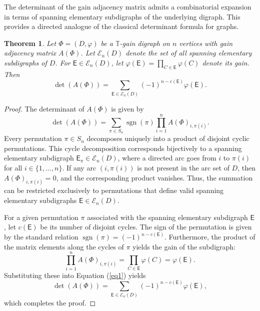 \documentclass[12pt]{article}
\newtheorem{theorem}{Theorem}[section]
\theoremstyle{definition}
\begin{document}
The determinant of the gain adjacency matrix admits a combinatorial expansion in terms of spanning elementary subdigraphs of the underlying digraph. This provides a directed analogue of the classical determinant formula for graphs.

\begin{theorem}
  \label{thm:sachs-det}
  Let $\Phi = (D, \varphi)$ be a $\mathbb{T}$-gain digraph on $n$ vertices with gain adjacency matrix $A(\Phi)$. Let $\mathcal{E}_n(D)$ denote the set of all spanning elementary subdigraphs of $D$. For $\mathsf{E} \in \mathcal{E}_n(D)$, 
  let $\varphi(\mathsf{E}) = \prod_{C \in \mathsf{E}} \varphi(C)$ denote its gain. Then
  \[
    \det(A(\Phi)) = \sum_{\mathsf{E} \in \mathcal{E}_n(D)} (-1)^{n - c(\mathsf{E})} \varphi(\mathsf{E}).
  \]
\end{theorem}

\begin{proof}
 The determinant of $A(\Phi)$ is given by
 \begin{equation}\label{eq1}
\det(A(\Phi)) = \sum_{\pi \in S_n} \operatorname{sgn}(\pi)
\prod_{i=1}^{n} A(\Phi)_{i,\pi(i)}.
\end{equation}
  Every permutation $\pi \in S_n$ decomposes uniquely into a product of disjoint cyclic permutations. This cycle decomposition corresponds bijectively to a spanning elementary subdigraph $\mathsf{E}_\pi \in \mathcal{E}_n(D)$, where a directed arc goes from $i$ to $\pi(i)$ for all $i \in \{1, \dots, n\}$. If any arc $(i, \pi(i))$ is not present in the arc set of $D$, then $A(\Phi)_{i,\pi(i)} = 0$, and the corresponding product vanishes. Thus, the summation can be restricted exclusively to permutations that define valid spanning elementary subdigraphs $\mathsf{E} \in \mathcal{E}_n(D)$.

  For a given permutation $\pi$ associated with the spanning elementary subdigraph $\mathsf{E}$, let $c(\mathsf{E})$ be its number of disjoint cycles. The sign of the permutation is given by the standard relation $\operatorname{sgn}(\pi) = (-1)^{n - c(\mathsf{E})}$. Furthermore, the product of the matrix elements along the cycles of $\pi$ yields the gain of the subdigraph:
  \[
    \prod_{i=1}^n A(\Phi)_{i,\pi(i)} = \prod_{C \in \mathsf{E}} \varphi(C) = \varphi(\mathsf{E}).
  \]
  Substituting these into Equation (\ref{eq1}) yields
  \[
    \det(A(\Phi)) = \sum_{\mathsf{E} \in \mathcal{E}_n(D)} (-1)^{n - c(\mathsf{E})} \varphi(\mathsf{E}),
  \]
  which completes the proof.
\end{proof}
\end{document}
